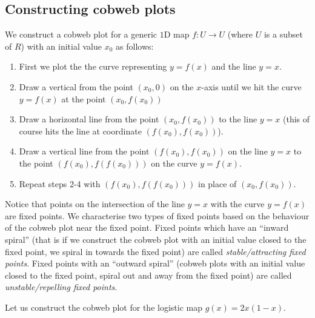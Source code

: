 \documentclass[
  a4paper,
  oneside,
  final]{krantz}
\providecommand{\tightlist}{%
  \setlength{\itemsep}{0pt}\setlength{\parskip}{0pt}}
\theoremstyle{definition}
\theoremstyle{definition}
\theoremstyle{definition}
\theoremstyle{definition}
\theoremstyle{remark}
\begin{document}
\hypertarget{cobwebsconstruction}{%
\subsection{Constructing cobweb plots}\label{cobwebsconstruction}}

We construct a cobweb plot for a generic \(1\)D map \(f:U \to U\) (where \(U\) is a subset of \(R\)) with an initial value \(x_0\) as follows:

\begin{palegreenbox}

\begin{enumerate}
\def\labelenumi{\arabic{enumi}.}
\setcounter{enumi}{-1}
\tightlist
\item
  First we plot the the curve representing \(y = f(x)\) and the line \(y=x\).
\item
  Draw a vertical from the point \((x_0,0)\) on the \(x\)-axis until we hit the curve \(y=f(x)\) at the point \((x_0, f(x_0))\)
\item
  Draw a horizontal line from the point \((x_0, f(x_0))\) to the line \(y=x\) (this of course hits the line at coordinate \((f(x_0), f(x_0))\)).
\item
  Draw a vertical line from the point \((f(x_0), f(x_0))\) on the line \(y=x\) to the point \((f(x_0), f(f(x_0)))\) on the curve \(y= f(x)\).
\item
  Repeat steps 2-4 with \((f(x_0),f(f(x_0)))\) in place of \((x_0, f(x_0))\).
\end{enumerate}

\end{palegreenbox}

Notice that points on the intersection of the line \(y=x\) with the curve \(y=f(x)\) are fixed points. We characterise two types of fixed points based on the behaviour of the cobweb plot near the fixed point. Fixed points which have an ``inward spiral'' (that is if we construct the cobweb plot with an initial value closed to the fixed point, we spiral in towards the fixed point) are called \emph{stable/attracting fixed points}. Fixed points with an ``outward spiral'' (cobweb plots with an initial value closed to the fixed point, spiral out and away from the fixed point) are called \emph{unstable/repelling fixed points}.

Let us construct the cobweb plot for the logistic map \(g(x) = 2x (1-x)\).
\end{document}
